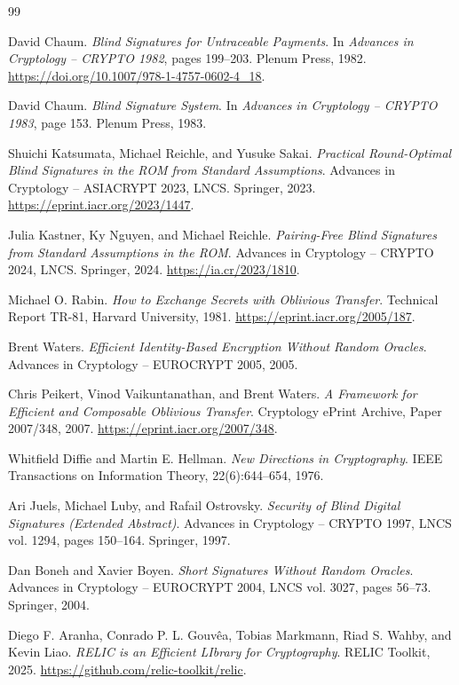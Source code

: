 \documentclass[10pt,a4paper]{article}
\theoremstyle{definition}
\theoremstyle{plain}
\theoremstyle{remark}
\begin{document}
\begin{thebibliography}{99}
\small

David Chaum.
\textit{Blind Signatures for Untraceable Payments}.
In \textit{Advances in Cryptology -- CRYPTO 1982},
pages 199--203.
Plenum Press, 1982.
\url{https://doi.org/10.1007/978-1-4757-0602-4_18}.

David Chaum.
\textit{Blind Signature System}.
In \textit{Advances in Cryptology -- CRYPTO 1983},
page 153.
Plenum Press, 1983.

Shuichi Katsumata, Michael Reichle, and Yusuke Sakai.
\textit{Practical Round-Optimal Blind Signatures in the ROM from Standard Assumptions}.
Advances in Cryptology -- ASIACRYPT 2023, LNCS.
Springer, 2023.
\url{https://eprint.iacr.org/2023/1447}.

Julia Kastner, Ky Nguyen, and Michael Reichle.
\textit{Pairing-Free Blind Signatures from Standard Assumptions in the ROM}.
Advances in Cryptology -- CRYPTO 2024, LNCS.
Springer, 2024.
\url{https://ia.cr/2023/1810}.

Michael O. Rabin.
\textit{How to Exchange Secrets with Oblivious Transfer}.
Technical Report TR-81, Harvard University, 1981.
\url{https://eprint.iacr.org/2005/187}.

Brent Waters.
\textit{Efficient Identity-Based Encryption Without Random Oracles}.
Advances in Cryptology -- EUROCRYPT 2005, 2005.

Chris Peikert, Vinod Vaikuntanathan, and Brent Waters.
\textit{A Framework for Efficient and Composable Oblivious Transfer}.
Cryptology ePrint Archive, Paper 2007/348, 2007.
\url{https://eprint.iacr.org/2007/348}.

Whitfield Diffie and Martin E. Hellman.
\textit{New Directions in Cryptography}.
IEEE Transactions on Information Theory, 22(6):644--654, 1976.

Ari Juels, Michael Luby, and Rafail Ostrovsky.
\textit{Security of Blind Digital Signatures (Extended Abstract)}.
Advances in Cryptology -- CRYPTO 1997, LNCS vol. 1294, pages 150--164.
Springer, 1997.

Dan Boneh and Xavier Boyen.
\textit{Short Signatures Without Random Oracles}.
Advances in Cryptology -- EUROCRYPT 2004, LNCS vol. 3027, pages 56--73.
Springer, 2004.

Diego F. Aranha, Conrado P. L. Gouvêa, Tobias Markmann, Riad S. Wahby, and
Kevin Liao.
\textit{RELIC is an Efficient LIbrary for Cryptography}.
RELIC Toolkit, 2025.
\url{https://github.com/relic-toolkit/relic}.


\end{thebibliography}
\end{document}
